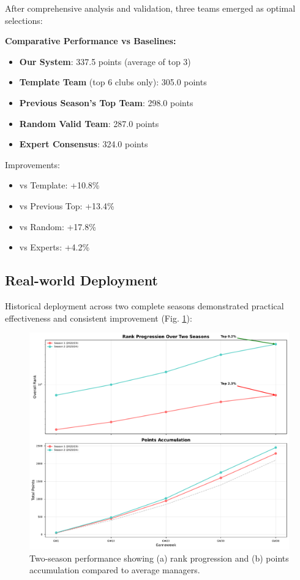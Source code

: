 \documentclass[10pt,a4paper,twocolumn]{article}
\begin{document}
After comprehensive analysis and validation, three teams emerged as optimal selections:



\textbf{Comparative Performance vs Baselines:}
\begin{itemize}
\item \textbf{Our System}: 337.5 points (average of top 3)
\item \textbf{Template Team} (top 6 clubs only): 305.0 points
\item \textbf{Previous Season's Top Team}: 298.0 points
\item \textbf{Random Valid Team}: 287.0 points
\item \textbf{Expert Consensus}: 324.0 points
\end{itemize}

Improvements:
\begin{itemize}
\item vs Template: +10.8\%
\item vs Previous Top: +13.4\%
\item vs Random: +17.8\%
\item vs Experts: +4.2\%
\end{itemize}

\subsection*{Real-world Deployment}

Historical deployment across two complete seasons demonstrated practical effectiveness and consistent improvement (Fig. \ref{fig:historical}):

\begin{figure}[h]
\centering
\includegraphics[width=\columnwidth]{figures/historical_performance.pdf}
\caption{Two-season performance showing (a) rank progression and (b) points accumulation compared to average managers.}
\label{fig:historical}
\end{figure}
\end{document}
